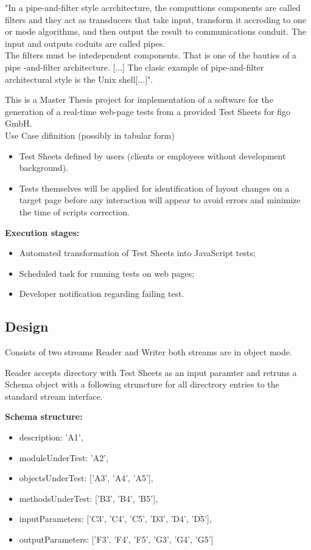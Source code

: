 \documentclass{llncs}
\begin{document}
"In a pipe-and-filter style acrchitecture, the computtions components are called filters and they act as transducers that take input, transform it accroding to one or mode algorithms, and then output the result to communications conduit. The input and outputs coduits are called pipes.\\
The filters must be intedependent components. That is one of the bauties of a pipe -and-filter architecture. [...] The clasic example of pipe-and-filter architectural style is the Unix shell[...]"\cite{Dooley}.


This is a Master Thesis project for implementation of a software for the generation of a real-time web-page tests from a provided Test Sheets for figo GmbH.\\

 Use Case difinition (possibly in tabular form)


\begin{itemize}
\item Test Sheets defined by users (clients or employees without development background).
\item Tests themselves will be applied for identification of layout changes on a target page before any interaction will appear to avoid errors and minimize the time of scripts correction.
\end{itemize}
 
\textbf{Execution stages:}
\begin{itemize}
\item Automated transformation of Test Sheets into JavaScript tests;
\item Scheduled task for running tests on web pages;
\item Developer notification regarding failing test.
\end{itemize}



\subsection{Design}
Consists of two streams Reader and Writer both streams are in object mode.

Reader accepts directory with  Test Sheets as an input paramter and retruns a Schema object with a following struncture for all directrory entries to the standard stream interface.

\textbf{Schema structure:}
\begin{itemize}
\item description: 'A1',
\item moduleUnderTest: 'A2',
\item objectsUnderTest: ['A3', 'A4', 'A5'],
\item methodsUnderTest: ['B3', 'B4', 'B5'],
\item inputParameters: ['C3', 'C4', 'C5', 'D3', 'D4', 'D5'],
\item outputParameters: ['F3', 'F4', 'F5', 'G3', 'G4', 'G5']
\end{itemize}
\end{document}
